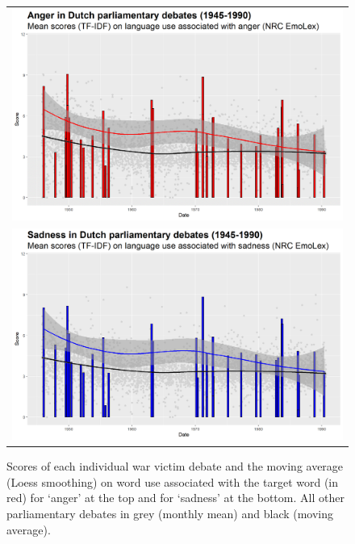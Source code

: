 \documentclass{dhbenelux}
\begin{document}
\begin{figure}
    \centering
    \begin{tabular}{c}
         \includegraphics[width=0.9\linewidth]{Images/graph1.png} \\
         \includegraphics[width=0.9\linewidth]{Images/graph2.png} \\ 
    \end{tabular}
    \caption{Scores of each individual war victim debate and the moving average (Loess smoothing) on word use associated with the target word (in red) for `anger' at the top and for `sadness' at the bottom. All other parliamentary debates in grey (monthly mean) and black (moving average).}
    \label{fig:graph}
\end{figure}

\end{document}
